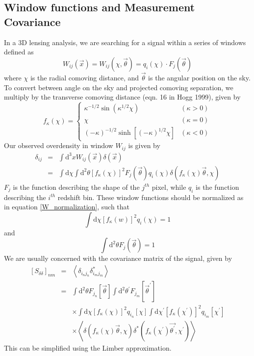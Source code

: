 \documentclass[12pt,preprint]{aastex}			%
\newcommand{\rcom}{\chi}
\newcommand{\dd}{\mathrm{d}}
\begin{document}
\subsection{Window functions and Measurement Covariance}
In a 3D lensing analysis, we are searching for a signal within a series
of windows defined as 
\begin{equation}
  W_{ij}(\vec{x}) = W_{ij}(\rcom,\vec{\theta}) 
  = q_i(\rcom) \cdot F_j(\vec\theta)
\end{equation}
where $\rcom$ is the radial comoving distance, and $\vec{\theta}$ is the
angular position on the sky.  To convert between angle on the sky and 
projected comoving separation, we multiply by the transverse comoving 
distance (eqn. 16 in Hogg 1999), given by
\begin{equation}
f_\kappa(\rcom) = \left\{
\begin{array}{ll}
  \kappa^{-1/2} \sin (\kappa^{1/2}\rcom) & (\kappa > 0) \\
  \rcom  & (\kappa = 0)\\
  (-\kappa)^{-1/2} \sinh [(-\kappa)^{1/2}\rcom] & (\kappa < 0)
\end{array}\right.
\end{equation}
Our observed overdensity in window $W_{ij}$ is given by
\begin{eqnarray}
  \delta_{ij} 
  & = & \int \dd^3x W_{ij}(\vec x)\delta(\vec x)\nonumber\\
  & = & \int \dd\rcom \int \dd^2\theta \left[ f_\kappa(\rcom)\right]^2F_j(\vec{\theta})   q_i(\rcom) \delta\left(f_\kappa(\rcom)\vec{\theta},\rcom\right)
\end{eqnarray}
$F_j$ is the function describing the shape of the $j^{th}$ pixel,
while $q_i$ is the function describing the $i^{th}$ redshift bin.
These window functions should be normalized as in equation \ref{W_normalization},
such that
\begin{equation}
  \label{q_normalization}
  \int \dd\rcom [f_\kappa(w)]^2 q_i(\rcom) = 1
\end{equation}
and
\begin{equation}
  \int \dd^2\theta F_j(\vec{\theta}) = 1
\end{equation}
We are usually concerned with the covariance matrix of the signal, given by
\begin{eqnarray}
  \label{Sdd}
  \left[S_{\delta\delta}\right]_{nm}
  & = & \left\langle \delta_{i_nj_n}\delta^*_{i_mj_m}\right\rangle \nonumber\\
  & = & \int \dd^2\theta F_{j_n}[\vec{\theta}] 
  \int \dd^2\theta^\prime F_{j_m}[\vec{\theta}^\prime] \nonumber\\
  & & \times
  \int \dd\rcom \left[f_\kappa(\rcom)\right]^2 q_{i_n}[\rcom]
  \int \dd\rcom^\prime \left[f_\kappa(\rcom^\prime)\right]^2 
  q_{i_m}[\rcom^\prime]\nonumber\\
  & &\times
  \left\langle
  \delta\left(f_\kappa(\rcom)\vec{\theta},
  \rcom\right)
  \delta^*\left(f_\kappa(\rcom^\prime)\vec{\theta^\prime},
  \rcom^\prime\right)
  \right\rangle
\end{eqnarray}
This can be simplified using the Limber approximation.
\end{document}
